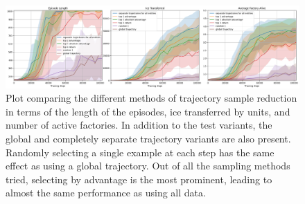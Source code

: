 \begin{figure}[htbp]
    \centering
    \includegraphics[width=0.95\linewidth]{images/results_hybrid/trajectory_sample_reduction/combined.png}
    \captionsetup{justification=justified, singlelinecheck=false, width=1\linewidth, labelfont=bf} 
    \caption[]{Plot comparing the different methods of trajectory sample reduction in terms of the length of the episodes, ice transferred by units, and number of active factories. In addition to the test variants, the global and completely separate trajectory variants are also present. Randomly selecting a single example at each step has the same effect as using a global trajectory. Out of all the sampling methods tried, selecting by advantage is the most prominent, leading to almost the same performance as using all data.}
    \label{fig:hybrid_results/trajectory_sample_reduction/combined}
\end{figure}

